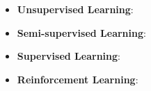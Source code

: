 \begin{itemize}
    \item \textbf{Unsupervised Learning}:
          
    \item \textbf{Semi-supervised Learning}:
          
    \item \textbf{Supervised Learning}:
          
    \item \textbf{Reinforcement Learning}:
          
\end{itemize}
